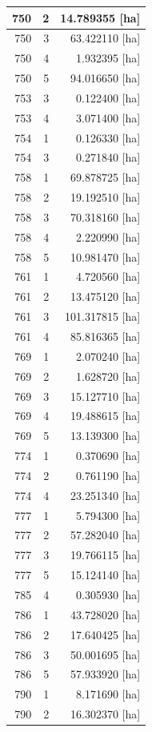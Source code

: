 \documentclass[11pt,]{book}
\begin{document}
\begin{table}
\begin{tabular}[t]{r|r|r}
\hline
750 & 2 & 14.789355 [ha]\\
\hline
750 & 3 & 63.422110 [ha]\\
\hline
750 & 4 & 1.932395 [ha]\\
\hline
750 & 5 & 94.016650 [ha]\\
\hline
753 & 3 & 0.122400 [ha]\\
\hline
753 & 4 & 3.071400 [ha]\\
\hline
754 & 1 & 0.126330 [ha]\\
\hline
754 & 3 & 0.271840 [ha]\\
\hline
758 & 1 & 69.878725 [ha]\\
\hline
758 & 2 & 19.192510 [ha]\\
\hline
758 & 3 & 70.318160 [ha]\\
\hline
758 & 4 & 2.220990 [ha]\\
\hline
758 & 5 & 10.981470 [ha]\\
\hline
761 & 1 & 4.720560 [ha]\\
\hline
761 & 2 & 13.475120 [ha]\\
\hline
761 & 3 & 101.317815 [ha]\\
\hline
761 & 4 & 85.816365 [ha]\\
\hline
769 & 1 & 2.070240 [ha]\\
\hline
769 & 2 & 1.628720 [ha]\\
\hline
769 & 3 & 15.127710 [ha]\\
\hline
769 & 4 & 19.488615 [ha]\\
\hline
769 & 5 & 13.139300 [ha]\\
\hline
774 & 1 & 0.370690 [ha]\\
\hline
774 & 2 & 0.761190 [ha]\\
\hline
774 & 4 & 23.251340 [ha]\\
\hline
777 & 1 & 5.794300 [ha]\\
\hline
777 & 2 & 57.282040 [ha]\\
\hline
777 & 3 & 19.766115 [ha]\\
\hline
777 & 5 & 15.124140 [ha]\\
\hline
785 & 4 & 0.305930 [ha]\\
\hline
786 & 1 & 43.728020 [ha]\\
\hline
786 & 2 & 17.640425 [ha]\\
\hline
786 & 3 & 50.001695 [ha]\\
\hline
786 & 5 & 57.933920 [ha]\\
\hline
790 & 1 & 8.171690 [ha]\\
\hline
790 & 2 & 16.302370 [ha]\\

\end{tabular}
\end{table}
\end{document}
